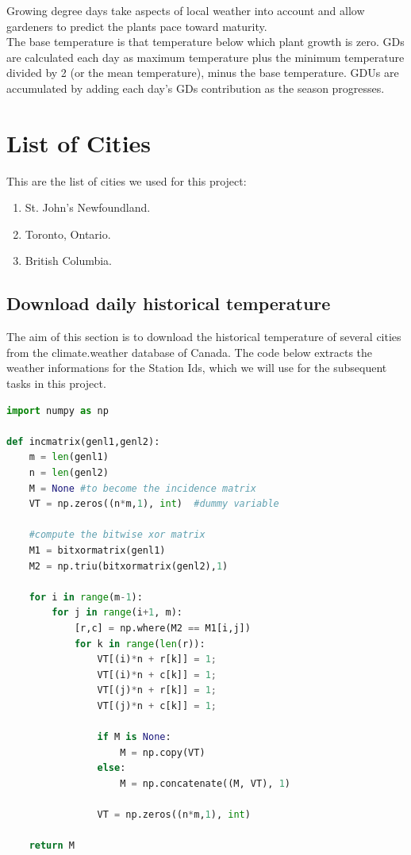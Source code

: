 Growing degree days take aspects of local weather into account and allow gardeners to predict the plants pace toward maturity.\\

The base temperature is that temperature below which plant growth is zero. GDs are calculated each day as maximum temperature plus the minimum temperature divided by 2 (or the mean temperature), minus the base temperature. GDUs are accumulated by adding each day’s GDs contribution as the season progresses.


\section{List of Cities }
This are the list of cities we used for this project:
\begin{enumerate}
\item St. John's Newfoundland.
\item Toronto, Ontario.
\item British Columbia.
\end{enumerate}
\label{sec:examples}

\subsection{Download daily historical temperature}
The aim of this section is to download the historical temperature of several cities from the climate.weather database of Canada. The code below extracts the weather informations for the Station Ids, which we will use for the subsequent tasks in this project.   

\begin{lstlisting}[language=Python]
import numpy as np
 
def incmatrix(genl1,genl2):
    m = len(genl1)
    n = len(genl2)
    M = None #to become the incidence matrix
    VT = np.zeros((n*m,1), int)  #dummy variable
 
    #compute the bitwise xor matrix
    M1 = bitxormatrix(genl1)
    M2 = np.triu(bitxormatrix(genl2),1) 
 
    for i in range(m-1):
        for j in range(i+1, m):
            [r,c] = np.where(M2 == M1[i,j])
            for k in range(len(r)):
                VT[(i)*n + r[k]] = 1;
                VT[(i)*n + c[k]] = 1;
                VT[(j)*n + r[k]] = 1;
                VT[(j)*n + c[k]] = 1;
 
                if M is None:
                    M = np.copy(VT)
                else:
                    M = np.concatenate((M, VT), 1)
 
                VT = np.zeros((n*m,1), int)
 
    return M
\end{lstlisting}

